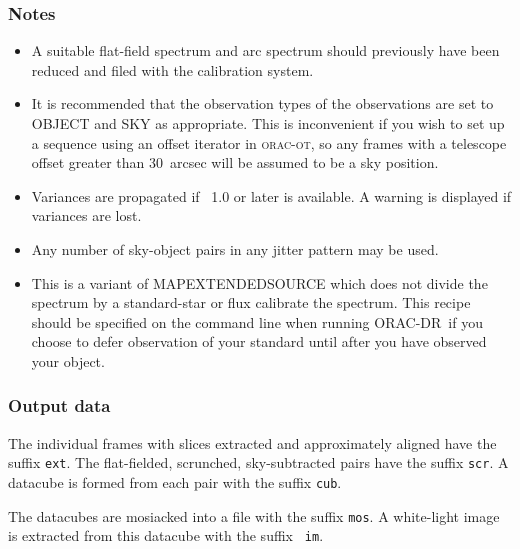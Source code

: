 \documentclass[twoside,11pt]{article}
\newcommand{\xref}[3]{#1}
\renewcommand{\_}{\texttt{\symbol{95}}}
\newcommand{\KAPPA}{\xref{{\sc{Kappa}}}{sun95}{}}
\newcommand{\ORACDR}{{\footnotesize ORAC-DR}}
\begin{document}
\subsubsection*{Notes}\begin{itemize}
\item

  A suitable flat-field spectrum and arc spectrum should previously
  have been reduced and filed with the calibration system.

\item

It is recommended that the observation types of the observations are set
to OBJECT and SKY as appropriate. This is inconvenient if you wish to
set up a sequence using an offset iterator in \textsc{orac-ot}, so any frames
with a telescope offset greater than 30~arcsec will be assumed to be a
sky position.

\item

Variances are propagated if \KAPPA\ 1.0 or later is available. A warning
is displayed if variances are lost.

\item

Any number of sky-object pairs in any jitter pattern may be used.

\item
    This is a variant of MAP\_EXTENDED\_SOURCE which does not divide the
  spectrum by a standard-star or flux calibrate the spectrum. This
  recipe should be specified on the command line when running
  \ORACDR\ if you choose to defer observation of your standard until
  after you have observed your object.


\end{itemize}

\subsubsection*{Output data}

The individual frames with slices extracted and approximately aligned
have the suffix {\tt \_ext}. The flat-fielded, scrunched,
sky-subtracted pairs have the suffix {\tt \_scr}. A datacube is
formed from each pair with the suffix {\tt \_cub}.

The datacubes are mosiacked into a file with the suffix {\tt \_mos}. A
white-light image is extracted from this datacube with the suffix {\tt
  \_im}.

\clearpage
\end{document}
